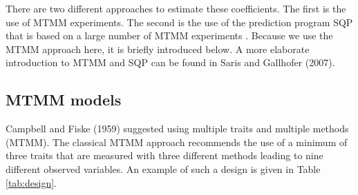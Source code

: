 \documentclass[a4paper,12pt]{article}
\begin{document}
There are two different approaches to estimate these coefficients. The first is the use of MTMM experiments. The second is the use of the prediction program SQP that is based on a large number of MTMM experiments \cite{oberski_sqp_}. Because we use the MTMM approach here, it is briefly introduced below. A more elaborate introduction to MTMM and SQP can be found in Saris and Gallhofer (2007).

\subsection{MTMM models}

Campbell and Fiske (1959) suggested using multiple traits and multiple methods (MTMM). The classical MTMM approach recommends the use of a minimum of three traits that are measured with three different methods leading to nine different observed variables. An example of such a design is given in Table \ref{tab:design}.  

\begin{table}[htb]\caption{The classic MTMM design used in the ESS pilot study.\label{tab:design}}
\end{table}
\end{document}

